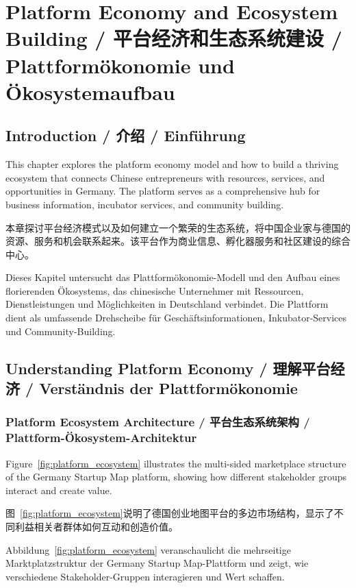 \chapter{Platform Economy and Ecosystem Building / 平台经济和生态系统建设 / Plattformökonomie und Ökosystemaufbau}

\section{Introduction / 介绍 / Einführung}

This chapter explores the platform economy model and how to build a thriving ecosystem that connects Chinese entrepreneurs with resources, services, and opportunities in Germany. The platform serves as a comprehensive hub for business information, incubator services, and community building.

本章探讨平台经济模式以及如何建立一个繁荣的生态系统，将中国企业家与德国的资源、服务和机会联系起来。该平台作为商业信息、孵化器服务和社区建设的综合中心。

Dieses Kapitel untersucht das Plattformökonomie-Modell und den Aufbau eines florierenden Ökosystems, das chinesische Unternehmer mit Ressourcen, Dienstleistungen und Möglichkeiten in Deutschland verbindet. Die Plattform dient als umfassende Drehscheibe für Geschäftsinformationen, Inkubator-Services und Community-Building.

\section{Understanding Platform Economy / 理解平台经济 / Verständnis der Plattformökonomie}

\subsection{Platform Ecosystem Architecture / 平台生态系统架构 / Plattform-Ökosystem-Architektur}

Figure~\ref{fig:platform_ecosystem} illustrates the multi-sided marketplace structure of the Germany Startup Map platform, showing how different stakeholder groups interact and create value.

图~\ref{fig:platform_ecosystem}说明了德国创业地图平台的多边市场结构，显示了不同利益相关者群体如何互动和创造价值。

Abbildung~\ref{fig:platform_ecosystem} veranschaulicht die mehrseitige Marktplatzstruktur der Germany Startup Map-Plattform und zeigt, wie verschiedene Stakeholder-Gruppen interagieren und Wert schaffen.

